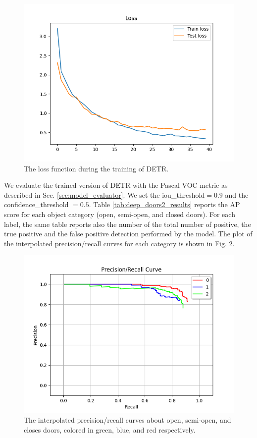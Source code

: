 \begin{figure}[h!]
	\centering
	\includegraphics[width=\linewidth]{images/deep_doors_2_loss.png}
	\caption{The loss function during the training of DETR.}
	\label{fig:deep_doors2_loss}
\end{figure}

We evaluate the trained version of DETR with the Pascal VOC metric \cite{pascal} as described in Sec. \ref{sec:model_evaluator}. We set the \textsf{iou\_threshold}$ = 0.9$ and the \textsf{confidence\_threshold} $= 0.5$. Table \ref{tab:deep_doors2_results} reports the AP score for each object category (open, semi-open, and closed doors). For each label, the same table reports also the number of the total number of positive, the true positive and the false positive detection performed by the model. The plot of the interpolated precision/recall curves for each category is shown in Fig. \ref{fig:deep_doors2_ap_plot}.

\begin{figure}[h!]
	\centering
	\includegraphics[width=\linewidth]{images/deep_doors_2_precision_recall.png}
	\caption{The interpolated precision/recall curves about open, semi-open, and closes doors, colored in green, blue, and red respectively.}
	\label{fig:deep_doors2_ap_plot}
\end{figure} 

